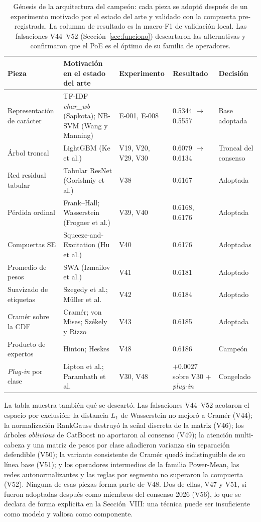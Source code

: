 \documentclass[journal]{IEEEtai}
\begin{document}
\begin{table}[htbp]
\centering
\caption{G\'enesis de la arquitectura del campe\'on: cada pieza se adopt\'o despu\'es de un experimento motivado por el estado del arte y validado con la compuerta pre-registrada. La columna de resultado es la macro-F1 de validaci\'on local. Las falsaciones V44--V52 (Secci\'on~\ref{sec:funciono}) descartaron las alternativas y confirmaron que el PoE es el \'optimo de su familia de operadores.}
\label{tab:genesis}
\footnotesize
\setlength{\tabcolsep}{3pt}
\begin{tabular}{p{}p{}p{}p{}p{}}
\toprule
Pieza & Motivaci\'on en el estado del arte & Experimento & Resultado & Decisi\'on \\
\midrule
Representaci\'on de car\'acter & TF-IDF \textit{char\_wb} (Sapkota); NB-SVM (Wang y Manning) & E-001, E-008 & 0.5344 $\to$ 0.5557 & Base adoptada \\
\'Arbol troncal & LightGBM (Ke et al.) & V19, V20, V29, V30 & 0.6079 $\to$ 0.6134 & Troncal del consenso \\
Red residual tabular & Tabular ResNet (Gorishniy et al.) & V38 & 0.6167 & Adoptada \\
P\'erdida ordinal & Frank--Hall; Wasserstein (Frogner et al.) & V39, V40 & 0.6168, 0.6176 & Adoptada \\
Compuertas SE & Squeeze-and-Excitation (Hu et al.) & V40 & 0.6176 & Adoptadas \\
Promedio de pesos & SWA (Izmailov et al.) & V41 & 0.6181 & Adoptado \\
Suavizado de etiquetas & Szegedy et al.; M\"uller et al. & V42 & 0.6184 & Adoptado \\
Cram\'er sobre la CDF & Cram\'er; von Mises; Sz\'ekely y Rizzo & V43 & 0.6185 & Adoptada \\
Producto de expertos & Hinton; Heskes & V48 & 0.6186 & Campe\'on \\
\textit{Plug-in} por clase & Lipton et al.; Parambath et al. & V30, V48 & $+0.0027$ sobre V30 + \textit{plug-in} & Congelado \\
\bottomrule
\end{tabular}
\end{table}

La tabla muestra tambi\'en qu\'e se descart\'o. Las falsaciones V44--V52 acotaron el espacio por
exclusi\'on: la distancia $L_1$ de Wasserstein no mejor\'o a Cram\'er (V44); la normalizaci\'on
RankGauss destruy\'o la se\~nal discreta de la matriz (V46); los \'arboles \textit{oblivious} de
CatBoost \cite{prokhorenkova2018} no aportaron al consenso (V49); la atenci\'on multi-cabeza y una
matriz de pesos por clase a\~nadieron varianza sin separaci\'on defendible (V50); la variante
consistente de Cram\'er qued\'o indistinguible de su l\'inea base (V51); y los operadores
intermedios de la familia Power-Mean, las redes autonormalizantes \cite{klambauer2017} y las reglas
por segmento no superaron la compuerta (V52). Ninguna de esas piezas forma parte de V48. Dos de
ellas, V47 y V51, s\'i fueron adoptadas despu\'es como miembros del consenso 2026 (V56), lo que se
declara de forma expl\'icita en la Secci\'on~VIII: una t\'ecnica puede ser insuficiente como modelo
y valiosa como componente.
\end{document}
